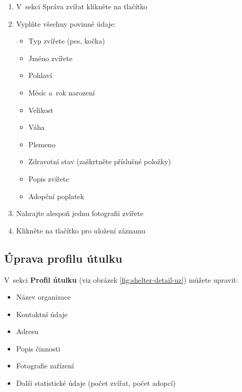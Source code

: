 \documentclass[czech, bp, kiv, he, iso690numb, pdf]{fasthesis}
\begin{document}
    \begin{enumerate}
        \item V~sekci Správa zvířat klikněte na tlačítko 
        \item Vyplňte všechny povinné údaje:
        \begin{itemize}
            \item Typ zvířete (pes, kočka)
            \item Jméno zvířete
            \item Pohlaví
            \item Měsíc a~rok narození
            \item Velikost
            \item Váha
            \item Plemeno
            \item Zdravotní stav (zaškrtněte příslušné položky)
            \item Popis zvířete
            \item Adopční poplatek
        \end{itemize}
        \item Nahrajte alespoň jednu fotografii zvířete
        \item Klikněte na tlačítko  pro uložení záznamu
    \end{enumerate}


    \subsection*{Úprava profilu útulku}

    V~sekci \textbf{Profil útulku} (viz obrázek \ref{fig:shelter-detail-uz}) můžete upravit:

    \begin{itemize}
        \item Název organizace
        \item Kontaktní údaje
        \item Adresu
        \item Popis činnosti
        \item Fotografie zařízení
        \item Další statistické údaje (počet zvířat, počet adopcí)
    \end{itemize}
\end{document}
